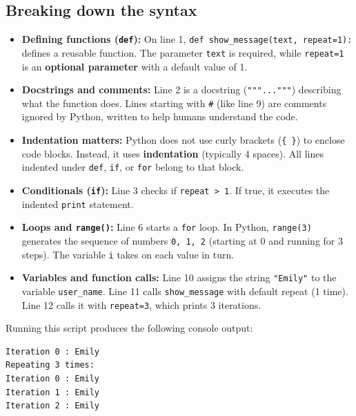 \subsection{Breaking down the syntax}

\begin{itemize}
    \item \textbf{Defining functions (\texttt{def}):} On line 1, \texttt{def show\_message(text, repeat=1):}
    defines a reusable function. The parameter \texttt{text} is required, while \texttt{repeat=1} is an
    \textbf{optional parameter} with a default value of 1.
    
    \item \textbf{Docstrings and comments:} Line 2 is a docstring (\texttt{"""..."""}) describing what the
    function does. Lines starting with \texttt{\#} (like line 9) are comments ignored by Python, written
    to help humans understand the code.
    
    \item \textbf{Indentation matters:} Python does not use curly brackets (\texttt{\{ \}}) to enclose code blocks.
    Instead, it uses \textbf{indentation} (typically 4 spaces). All lines indented under \texttt{def},
    \texttt{if}, or \texttt{for} belong to that block.
    
    \item \textbf{Conditionals (\texttt{if}):} Line 3 checks if \texttt{repeat > 1}. If true, it executes the indented
    \texttt{print} statement.
    
    \item \textbf{Loops and \texttt{range()}:} Line 6 starts a \texttt{for} loop. In Python, \texttt{range(3)}
    generates the sequence of numbers \texttt{0, 1, 2} (starting at 0 and running for 3 steps). The variable
    \texttt{i} takes on each value in turn.
    
    \item \textbf{Variables and function calls:} Line 10 assigns the string \texttt{"Emily"} to the variable
    \texttt{user\_name}. Line 11 calls \texttt{show\_message} with default repeat (1 time). Line 12 calls it
    with \texttt{repeat=3}, which prints 3 iterations.
\end{itemize}

Running this script produces the following console output:
\begin{verbatim}
Iteration 0 : Emily
Repeating 3 times:
Iteration 0 : Emily
Iteration 1 : Emily
Iteration 2 : Emily
\end{verbatim}

